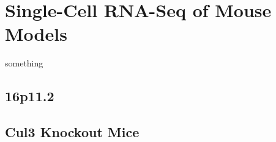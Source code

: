 \chapter{Single-Cell RNA-Seq of Mouse Models}
something
\section{16p11.2}
\section{Cul3 Knockout Mice}